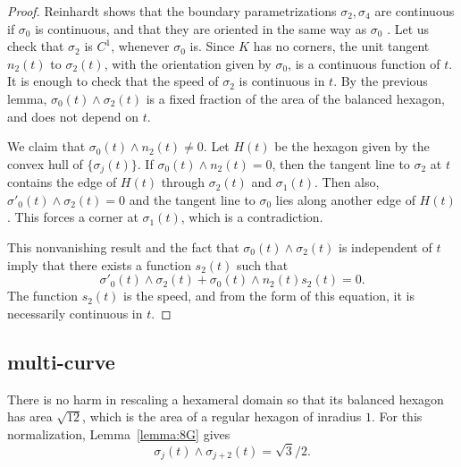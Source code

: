 \documentclass[11pt]{amsart}
\begin{document}
\begin{proof}  Reinhardt shows that the boundary parametrizations
$\sigma_2,\sigma_4$
are continuous if $\sigma_0$ is continuous, and that they
are oriented in the same
way as $\sigma_0$ \cite[p.222]{R}.  Let us check that $\sigma_2$
is $C^1$, whenever $\sigma_0$ is.  Since $K$ has no corners, the
unit tangent $n_2(t)$ to $\sigma_2(t)$, 
with the orientation given by $\sigma_0$, 
is a continuous function of $t$.  It is enough to check
that the speed of $\sigma_2$ is continuous in $t$.  
By the previous lemma, ${\sigma_0(t)}\land{\sigma_2(t)}$ is a fixed fraction
of the area of the balanced hexagon, and does not depend on $t$.

We claim that ${\sigma_0(t)}\land{n_2(t)}\ne 0$.
Let $H(t)$ be the hexagon given by the convex hull of $\{\sigma_j(t)\}$.
If ${\sigma_0(t)}\land{n_2(t)}=0$, then the tangent line to $\sigma_2$ at
$t$ contains the edge of $H(t)$ through $\sigma_2(t)$ and $\sigma_1(t)$.
Then also, ${\sigma'_0(t)}\land{\sigma_2(t)}=0$ and the tangent line
to $\sigma_0$ lies along another edge of $H(t)$.  This forces a corner
at $\sigma_1(t)$, which is a contradiction.

This nonvanishing result and the fact that ${\sigma_0(t)}\land{\sigma_2(t)}$ 
is independent of $t$ imply that there exists a function
$s_2(t)$ such that 
  \begin{equation}\label{eqn:sB}
  {\sigma'_0(t)}\land{\sigma_2(t)} + {\sigma_0(t)}\land{n_2(t)} s_2(t) = 0.
  \end{equation}
The function $s_2(t)$ is the speed, and from the form of this equation,
it is necessarily continuous in $t$.
\end{proof}



\subsection{multi-curve}

There is no harm in rescaling a hexameral domain so that its balanced
hexagon has  area $\sqrt{12}$, which is the area of a regular hexagon of inradius $1$.
For this normalization,
Lemma~\ref{lemma:8G} gives
 \begin{equation}\label{eqn:AB}
 {\sigma_j(t)}\land{\sigma_{j+2}(t)} = \sqrt{3}/2.
 \end{equation}
\end{document}
